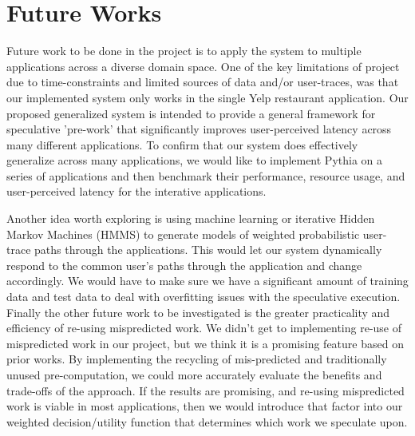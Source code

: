\section{Future Works}
\label{sec:future}

Future work to be done in the project is to apply the system to multiple applications across a diverse domain space. One of the key limitations of project due to time-constraints and limited sources of data and/or user-traces, was that our implemented system only works in the single Yelp restaurant application. Our proposed generalized system is intended to provide a general framework for speculative 'pre-work' that significantly improves user-perceived latency across many different applications. To confirm that our system does effectively generalize across many applications, we would like to implement Pythia on a series of applications and then benchmark their performance, resource usage, and user-perceived latency for the interative applications. 

Another idea worth exploring is using machine learning or iterative Hidden Markov Machines (HMMS) to generate models of weighted probabilistic user-trace paths through the applications. This would let our system dynamically respond to the common user's paths through the application and change accordingly. We would have to make sure we have a significant amount of training data and test data to deal with overfitting issues with the speculative execution. Finally the other future work to be investigated is the greater practicality and efficiency of re-using mispredicted work. We didn't get to implementing re-use of mispredicted work in our project, but we think it is a promising feature based on prior works. By implementing the recycling of mis-predicted and traditionally unused pre-computation, we could more accurately evaluate the benefits and trade-offs of the approach. If the results are promising, and re-using mispredicted work is viable in most applications, then we would introduce that factor into our weighted decision/utility function that determines which work we speculate upon.